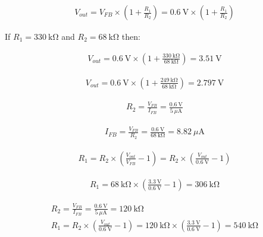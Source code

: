 \documentclass{article}
\begin{document}
\begin{align}
	V_{out} = V_{FB} \times \left( 1 + \frac{R_1}{R_2} \right) = \qty{0.6}{\volt} \times \left( 1 + \frac{R_1}{R_2} \right) \nonumber
\end{align}

If $R_1 = \qty{330}{\kilo\ohm}$ and $R_2 = \qty{68}{\kilo\ohm}$ then:

\begin{align}
	V_{out} = \qty{0.6}{\volt} \times \left( 1 + \frac{ \qty{330}{\kilo\ohm} }{ \qty{68}{\kilo\ohm} } \right) = \qty{3.51}{\volt} \nonumber
\end{align}

\begin{align}
	V_{out} = \qty{0.6}{\volt} \times \left( 1 + \frac{ \qty{249}{\kilo\ohm} }{ \qty{68}{\kilo\ohm} } \right) = \qty{2.797}{\volt} \nonumber
\end{align}

\begin{align}
	R_2 = \frac{V_{FB}}{I_{FB}} = \frac{ \qty{0.6}{\volt} }{ \qty{5}{\mu\ampere} } \nonumber
\end{align}

\begin{align}
	I_{FB} = \frac{V_{FB}}{R_2} = \frac{ \qty{0.6}{\volt} }{ \qty{68}{\kilo\ohm} } = \qty{8.82}{\mu\ampere} \nonumber
\end{align}

\begin{align}
	R_1 = R_2 \times \left( \frac{V_{out}}{ V_{FB} } - 1 \right) = R_2 \times \left( \frac{V_{out}}{ \qty{0.6}{\volt} } -1 \right) \nonumber
\end{align}

\begin{align}
	R_1 = \qty{68}{\kilo\ohm} \times \left( \frac{ \qty{3.3}{\volt} }{ \qty{0.6}{\volt} } -1 \right) = \qty{306}{\kilo\ohm} \nonumber
\end{align}

\begin{align}
	R_2 = \frac{V_{FB}}{I_{FB}} = \frac{ \qty{0.6}{\volt} }{ \qty{5}{\mu\ampere} } = \qty{120}{\kilo\ohm}\\
	R_1 = R_2 \times \left( \frac{V_{out}}{ \qty{0.6}{\volt} } -1 \right) = \qty{120}{\kilo\ohm} \times \left( \frac{ \qty{3.3}{\volt} }{ \qty{0.6}{\volt} } - 1 \right) = \qty{540}{\kilo\ohm}
\end{align}
\end{document}
